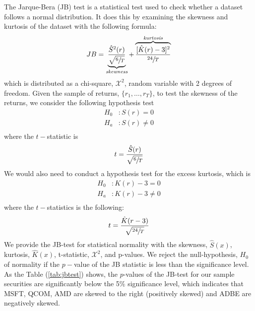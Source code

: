 \documentclass[12pt]{article}
\begin{document}
The Jarque-Bera (JB) test is a statistical test used to check whether a dataset follows a normal distribution. It does this by examining the skewness and kurtosis of the dataset with the following formula:
\begin{equation}
	JB= \underbrace{\frac{\hat{S}^2(r)}{\sqrt{\sfrac{6}{T}}}}_{\textit{skewness}}  +\overbrace{\frac{[\hat{K}(r)-3]^2}{\sfrac{24}{T}}}^{\textit{kurtosis}}
\end{equation}
which is distributed as a chi-square, $\mathcal{X}^2$, random variable with 2 degrees of freedom. Given the sample of returns, $\lbrace r_1,\ldots,r_T\rbrace$, to test the skewness of the returns, we consider the following hypothesis test
\[
\begin{aligned}
	H_0&:S(r)= 0\\
	H_a&:S(r)\neq 0\\
\end{aligned}
\]
where the $t-$statistic is 
\begin{equation}
	t=\frac{\hat{S}(r)}{\sqrt{\sfrac{6}{T}}}
\end{equation}
We would also need to conduct a hypothesis test for the excess kurtosis, which is
\[
\begin{aligned}
	H_0&:K(r)-3= 0\\
	H_a&:K(r)-3\neq 0\\
\end{aligned}
\]
where the $t-$statistics is the following:
\begin{equation}
	t=\frac{\hat{K}(r-3)}{\sqrt{\sfrac{24}{T}}}
\end{equation}
We provide the JB-test for statistical normality with the skewness, $\hat{S}(x)$, kurtosis, $\hat{K}(x)$, t-statistic, $\mathcal{X}^2$, and p-values. We reject the null-hypothesis, $H_0$ of normality if the $p-$value of the JB statistic is less than the significance level. As the Table (\ref*{tab:jbtest}) shows, the $p$-values of the JB-test for our sample securities are significantly below the 5\% significance level, which indicates that MSFT, QCOM, AMD are skewed to the right (positively skewed) and ADBE are negatively skewed.
\end{document}
